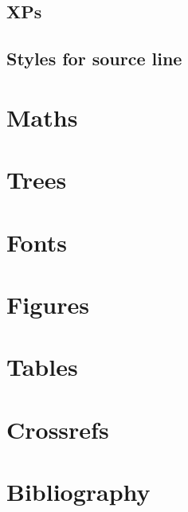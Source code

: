 \documentclass[output=book
  ,colorlinks
  ,showindex
  ,draftmode
  ,openreview
  ,nobabel
  ,booklanguage=italian
  ,oldstylenumbers
  ,multiauthors
  ,biblatex
  ]{langscibook}
\begin{document}
\subsection{XPs}




\subsection{Styles for source line}




% 

\section{Maths}


\section{Trees}


\section{Fonts}

% 


\section{Figures}\label{sec:tables}

\section{Tables}\label{sec:tables}


\section{Crossrefs}


\section{Bibliography}

% 
\end{document}
